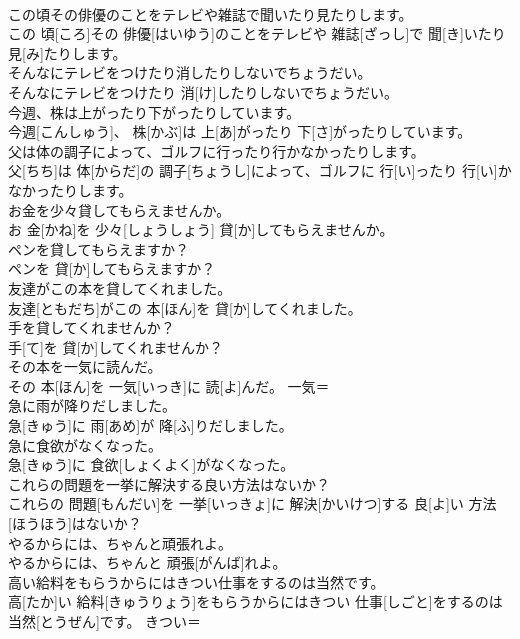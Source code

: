 \documentclass[8pt]{extreport}
\begin{document}
\begin{CJK}{UTF8}{min}
\\	この頃その俳優のことをテレビや雑誌で聞いたり見たりします。	
\\	この 頃[ころ]その 俳優[はいゆう]のことをテレビや 雑誌[ざっし]で 聞[き]いたり 見[み]たりします。	
\\	そんなにテレビをつけたり消したりしないでちょうだい。	
\\	そんなにテレビをつけたり 消[け]したりしないでちょうだい。	
\\	今週、株は上がったり下がったりしています。	
\\	今週[こんしゅう]、 株[かぶ]は 上[あ]がったり 下[さ]がったりしています。	
\\	父は体の調子によって、ゴルフに行ったり行かなかったりします。	
\\	父[ちち]は 体[からだ]の 調子[ちょうし]によって、ゴルフに 行[い]ったり 行[い]かなかったりします。	
\\	お金を少々貸してもらえませんか。	
\\	お 金[かね]を 少々[しょうしょう] 貸[か]してもらえませんか。	
\\	ペンを貸してもらえますか？	
\\	ペンを 貸[か]してもらえますか？	
\\	友達がこの本を貸してくれました。	
\\	友達[ともだち]がこの 本[ほん]を 貸[か]してくれました。	
\\	手を貸してくれませんか？	
\\	手[て]を 貸[か]してくれませんか？	
\\	その本を一気に読んだ。	
\\	その 本[ほん]を 一気[いっき]に 読[よ]んだ。	一気＝ 
\\	急に雨が降りだしました。	
\\	急[きゅう]に 雨[あめ]が 降[ふ]りだしました。	
\\	急に食欲がなくなった。	
\\	急[きゅう]に 食欲[しょくよく]がなくなった。	
\\	これらの問題を一挙に解決する良い方法はないか？	
\\	これらの 問題[もんだい]を 一挙[いっきょ]に 解決[かいけつ]する 良[よ]い 方法[ほうほう]はないか？	
\\	やるからには、ちゃんと頑張れよ。	
\\	やるからには、ちゃんと 頑張[がんば]れよ。	
\\	高い給料をもらうからにはきつい仕事をするのは当然です。	
\\	高[たか]い 給料[きゅうりょう]をもらうからにはきつい 仕事[しごと]をするのは 当然[とうぜん]です。	きつい＝ 

\end{CJK}
\end{document}
